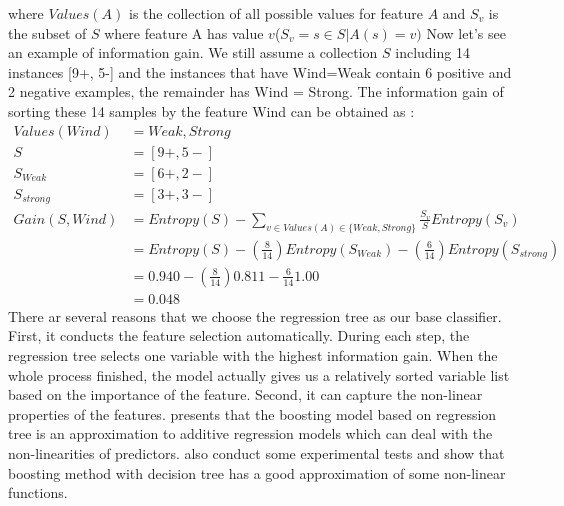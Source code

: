 where $Values(A)$ is the collection of all possible values for feature $A$ and $S_v$ is the subset of $S$ where feature A has value $v$($S_v={s\in S|A(s)=v})$
Now let's see an example of information gain. We still assume a collection $S$ including 14 instances [9+, 5-] and the instances that have Wind=Weak contain 6 positive and 2 negative examples,  the remainder has Wind = Strong. The information gain of sorting these 14 samples by the feature Wind can be obtained as : 
\begin{equation}
\begin{aligned}
Values(Wind)&=Weak, Strong\\
S&=[9+, 5-]\\
S_{Weak}&=[6+, 2-]\\
S_{strong}&=[3+, 3-]\\
Gain(S, Wind)&=Entropy(S)-\sum_{v\in Values(A)\in\{Weak, Strong\}}\frac{S_v}{S}Entropy(S_v)\\
&=Entropy(S)-(\frac{8}{14})Entropy(S_{Weak})-(\frac{6}{14})Entropy(S_{strong})\\
&=0.940 -(\frac{8}{14})0.811-\frac{6}{14}1.00\\
&=0.048
\end{aligned}
\end{equation}
There ar several reasons that we choose the regression tree as our base classifier. First,  it conducts the feature selection automatically. During each step,  the regression tree selects one variable with the highest information gain. When the whole process finished,  the model actually gives us a relatively sorted variable list based on the importance of the feature. Second, it can capture the non-linear properties of the features. \cite{friedman2000additive} presents that the boosting model based on regression tree is an approximation to additive regression models which can deal with the non-linearities of predictors. \cite{friedman2000additive} also conduct some experimental tests and show that boosting method with decision tree has a good approximation of some non-linear functions.
